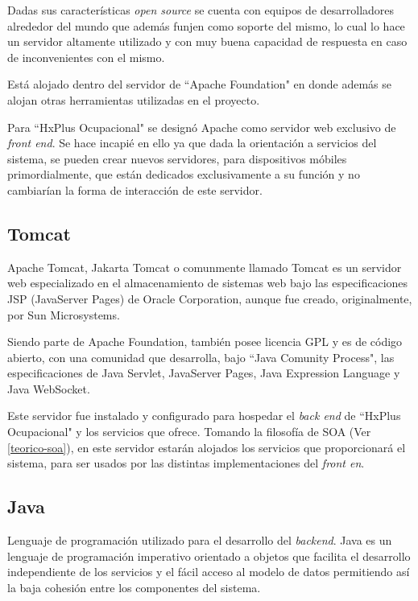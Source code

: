         Dadas sus características \textit{open source} se cuenta con equipos de desarrolladores alrededor del mundo que además funjen como soporte del mismo, lo cual lo hace un servidor altamente utilizado y con muy buena capacidad de respuesta en caso de inconvenientes con el mismo.
        
        Está alojado dentro del servidor de ``Apache Foundation"\cite{APACHE-maven} en donde además se alojan otras herramientas utilizadas en el proyecto.
        
        Para ``HxPlus Ocupacional" se designó Apache como servidor web exclusivo de \textit{front end}. Se hace incapié en ello ya que dada la orientación a servicios del sistema, se pueden crear nuevos servidores, para dispositivos móbiles primordialmente, que están dedicados exclusivamente a su función y no cambiarían la forma de interacción de este servidor.
        
        \subsection{Tomcat}
        \label{tecno-tomcat}
        
        Apache Tomcat, 	Jakarta Tomcat o comunmente llamado Tomcat es un servidor web especializado en el almacenamiento de sistemas web bajo las especificaciones JSP (JavaServer Pages) de Oracle Corporation, aunque fue creado, originalmente, por Sun Microsystems.
        
        Siendo parte de Apache Foundation, también posee licencia GPL y es de código abierto, con una comunidad que desarrolla, bajo ``Java Comunity Process", las especificaciones de Java Servlet, JavaServer Pages, Java Expression Language y Java WebSocket\cite{APACHE-tomcat}.
        
        Este servidor fue instalado y configurado para hospedar el \textit{back end} de ``HxPlus Ocupacional" y los servicios que ofrece. Tomando la filosofía de SOA (Ver \ref{teorico-soa}), en este servidor estarán alojados los servicios que proporcionará el sistema, para ser usados por las distintas implementaciones del \textit{front en}.
    
        \subsection{Java}
        \label{tecno-java}
        
        Lenguaje de programación utilizado para el desarrollo del \textit{backend}. Java es un lenguaje de programación imperativo orientado a objetos que facilita el desarrollo independiente de los servicios y el fácil acceso al modelo de datos permitiendo así la baja cohesión entre los componentes del sistema.
        
